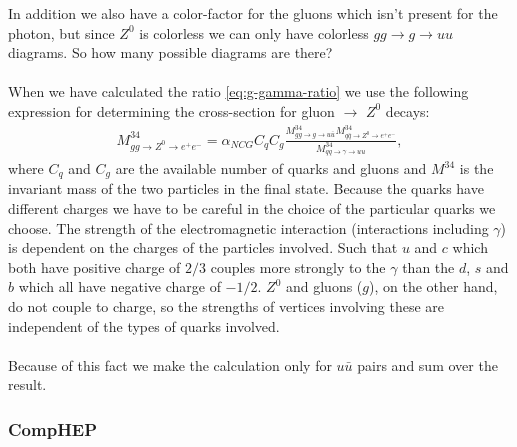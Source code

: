 In addition we also have a color-factor for the gluons which isn't present for the photon, but since $Z^0$ is colorless we can only have colorless $gg \rightarrow g \rightarrow uu$ diagrams. So how many possible diagrams are there?
\\ \\
When we have calculated the ratio \eqref{eq:g-gamma-ratio} we use the following expression for determining the cross-section for gluon $\rightarrow$ $Z^0$ decays:
\begin{align}
	M^{34}_{gg \rightarrow Z^0 \rightarrow e^+e^-} = \alpha_{NCG} C_q C_g \frac{M^{34}_{gg \rightarrow g \rightarrow u\bar{u}} M^{34}_{q\bar{q} \rightarrow Z^0 \rightarrow e^+e^-}} {M^{34}_{qq \rightarrow \gamma \rightarrow uu}},
\end{align}
where $C_q$ and $C_g$ are the available number of quarks and gluons and $M^{34}$ is the invariant mass of the two particles in the final state. Because the quarks have different charges we have to be careful in the choice of the particular quarks we choose. The strength of the electromagnetic interaction (interactions including $\gamma$) is dependent on the charges of the particles involved. Such that $u$ and $c$ which both have positive charge of $2/3$ couples more strongly to the $\gamma$ than the $d$, $s$ and $b$ which all have negative charge of $-1/2$. $Z^0$ and gluons ($g$), on the other hand, do not couple to charge, so the strengths of vertices involving these are independent of the types of quarks involved.
\\ \\
Because of this fact we make the calculation only for $u\bar{u}$ pairs and sum over the result.

\subsubsection{CompHEP}

